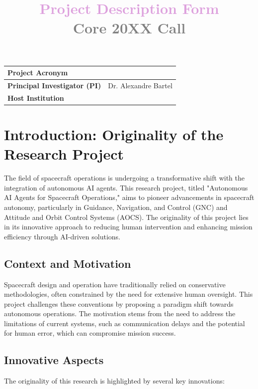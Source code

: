 \documentclass[a4paper, 11pt]{article}
\title{\bf \textcolor{Plum}{Project Description Form} \\ \textcolor{Gray}{Core 20XX Call}}
\author{\vspace{-5ex}}
\date{\vspace{-5ex}}
\begin{document}
\vspace{10cm}
\maketitle

\begin{center}
\begin{tabular}{|p{4.5cm}|p{}|}
\hline
\bf Project Acronym  &  \\ \hline
\bf Principal Investigator (PI)  &  Dr. Alexandre Bartel \\ \hline
\bf Host Institution  & \\ \hline
\end{tabular}
\end{center}

\newpage
\section{Introduction: Originality of the Research Project}

The field of spacecraft operations is undergoing a transformative shift with the integration of autonomous AI agents. This research project, titled "Autonomous AI Agents for Spacecraft Operations," aims to pioneer advancements in spacecraft autonomy, particularly in Guidance, Navigation, and Control (GNC) and Attitude and Orbit Control Systems (AOCS). The originality of this project lies in its innovative approach to reducing human intervention and enhancing mission efficiency through AI-driven solutions.

\subsection{Context and Motivation}

Spacecraft design and operation have traditionally relied on conservative methodologies, often constrained by the need for extensive human oversight. This project challenges these conventions by proposing a paradigm shift towards autonomous operations. The motivation stems from the need to address the limitations of current systems, such as communication delays and the potential for human error, which can compromise mission success.

\subsection{Innovative Aspects}

The originality of this research is highlighted by several key innovations:
\end{document}
